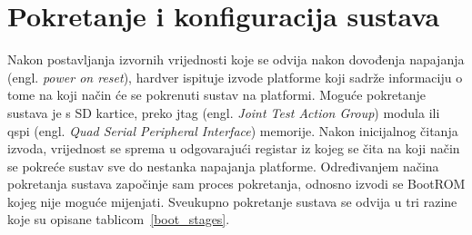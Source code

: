 \documentclass[times, utf8, diplomski, numeric]{fer}
\begin{document}
\section{Pokretanje i konfiguracija sustava}
Nakon postavljanja izvornih vrijednosti koje se odvija nakon dovođenja napajanja (engl. \textit{power
on reset}), hardver ispituje izvode platforme koji sadrže informaciju o tome na koji način će se pokrenuti sustav na
platformi. Moguće pokretanje sustava je s SD kartice, preko \gls{jtag} (engl. \textit{Joint Test Action Group}) modula
ili \gls{qspi} (engl. \textit{Quad Serial Peripheral Interface}) memorije. Nakon inicijalnog
čitanja izvoda, vrijednost se sprema u odgovarajući registar iz kojeg se čita na koji način se pokreće sustav sve do
nestanka napajanja platforme. Određivanjem načina pokretanja sustava započinje sam proces pokretanja, odnosno
izvodi se BootROM kojeg nije moguće mijenjati. Sveukupno pokretanje sustava se odvija u tri razine
koje su opisane tablicom~\ref{boot_stages}.
\end{document}
